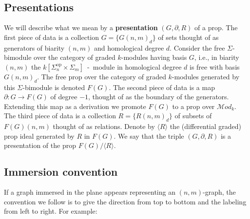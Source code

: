\documentclass{amsart}
\newcommand{\Mod}{\mathcal{M}od_{k}}
\theoremstyle{definition}
\begin{document}
	\subsection{Presentations} We will describe what we mean by a \textbf{presentation} $(G,\partial, R)$ of a prop. The first piece of data is a collection $G=\{G(n,m)_d\}$ of sets thought of as generators of biarity $(n,m)$ and homological degree $d$. Consider the free $\Sigma$-bimodule over the category of graded $k$-modules having basis $G$, i.e., in biarity $(n,m)$ the $k[\Sigma_n^{\mathrm{op}}\times\Sigma_m]$~-~module in homological degree $d$ is free with basis $G(n,m)_d$. The free prop over the category of graded $k$-modules generated by this $\Sigma$-bimodule is denoted $F(G)$. The second piece of data is a map $\partial: G\to F(G)$ of degree $-1$, thought of as the boundary of the generators. Extending this map as a derivation we promote $F(G)$ to a prop over $\Mod$. The third piece of data is a collection $R=\{R(n,m)_d\}$ of subsets of $F(G)(n,m)$ thought of as relations. Denote by $\langle R\rangle$ the (differential graded) prop ideal generated by $R$ in $F(G)$. We say that the triple $(G,\partial,R)$ is a presentation of the prop $F(G)/\langle R\rangle$.
	
	\subsection{Immersion convention} If a graph immersed in the plane appears representing an $(n,m)$-graph, the convention we  follow is to give the direction from top to bottom and the labeling from left to right. For example:
	
\end{document}
